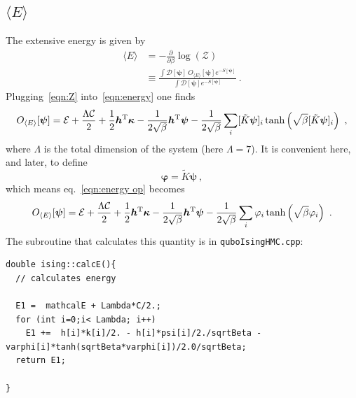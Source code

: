 \documentclass[11pt]{article}
\begin{document}
\subsection{$\langle E\rangle$}
The extensive energy is given by
\begin{align}
\langle E\rangle&=-\frac{\partial}{\partial \beta} \log (\mathcal{Z})\label{eqn:energy}\\
&\equiv\frac{\int\mathcal{D}[\bm\psi]\ O_{\langle E\rangle}[\bm\psi]e^{-S[\bm\psi]}}{\int\mathcal{D}[\bm\psi]e^{-S[\bm\psi]}}\ .
\end{align}
Plugging~\eqref{eqn:Z} into~\eqref{eqn:energy} one finds
\begin{equation}\label{eqn:energy op}
O_{\langle E\rangle}[\bm\psi]=\mathcal{E}+\frac{\Lambda\mathcal{C}}{2}
+\frac{1}{2}\bm h^{\rm T}\bm\kappa
-\frac{1}{2\sqrt{\beta}}\bm h^{\rm T}\bm\psi
-\frac{1}{2 \sqrt{\beta}} \sum_{i} [\tilde{K}\bm\psi]_i \tanh \left(\sqrt{\beta} [\tilde{K}\bm\psi]_i\right)\ ,
\end{equation}
where $\Lambda$ is the total dimension of the system  (here $\Lambda=7$). 
It is convenient here, and later, to define
\begin{equation}
\bm\varphi = \tilde K\bm \psi\ ,
\end{equation}
which means eq.~\eqref{eqn:energy op} becomes
\begin{equation}\label{eqn:energy op2}
O_{\langle E\rangle}[\bm\psi]=\mathcal{E}+\frac{\Lambda\mathcal{C}}{2}
+\frac{1}{2}\bm h^{\rm T}\bm\kappa
-\frac{1}{2\sqrt{\beta}}\bm h^{\rm T}\bm\psi
-\frac{1}{2 \sqrt{\beta}} \sum_{i} \varphi_i \tanh \left(\sqrt{\beta} \varphi_i\right)\ .
\end{equation}
The subroutine that calculates this quantity is in \texttt{quboIsingHMC.cpp}:
{\tiny
\begin{lstlisting}
double ising::calcE(){
  // calculates energy

  E1 =  mathcalE + Lambda*C/2.;
  for (int i=0;i< Lambda; i++)
    E1 +=  h[i]*k[i]/2. - h[i]*psi[i]/2./sqrtBeta - varphi[i]*tanh(sqrtBeta*varphi[i])/2.0/sqrtBeta;
  return E1;
    
}
\end{lstlisting}
}
\end{document}
